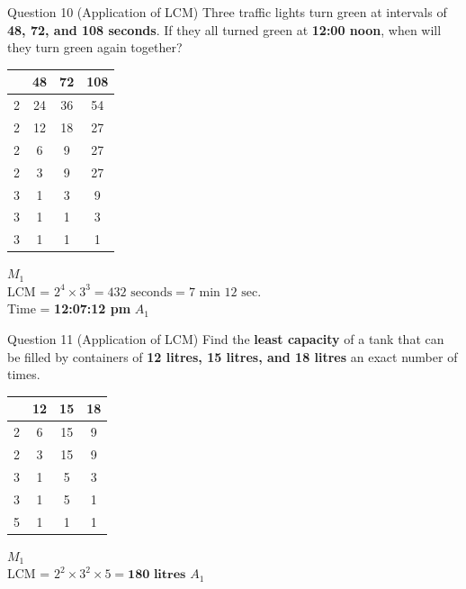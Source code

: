\documentclass[12pt, a4paper, oneside]{article}
\begin{document}
\begin{solvingbox}{Question 10 (Application of LCM)}
Three traffic lights turn green at intervals of \textbf{48, 72, and 108 seconds}. If they all turned green at \textbf{12:00 noon}, when will they turn green again together? \\
\begin{tabular}{|c|c|c|c|} \hline
    & \textbf{48} & \textbf{72} & \textbf{108} \\ \hline
    2 & 24 & 36 & 54 \\ \hline
    2 & 12 & 18 & 27 \\ \hline
    2 & 6 & 9 & 27 \\ \hline
    2 & 3 & 9 & 27 \\ \hline
    3 & 1 & 3 & 9 \\ \hline
    3 & 1 & 1 & 3 \\ \hline
    3 & 1 & 1 & 1 \\ \hline
\end{tabular} \hfill $M_1$ \\
LCM = $2^4 \times 3^3 = 432\text{ seconds} = 7\text{ min } 12\text{ sec}$. \\
Time = \textbf{12:07:12 pm} \hfill $A_1$
\end{solvingbox}

\begin{solvingbox}{Question 11 (Application of LCM)}
Find the \textbf{least capacity} of a tank that can be filled by containers of \textbf{12 litres, 15 litres, and 18 litres} an exact number of times. \\
\begin{tabular}{|c|c|c|c|} \hline
    & \textbf{12} & \textbf{15} & \textbf{18} \\ \hline
    2 & 6 & 15 & 9 \\ \hline
    2 & 3 & 15 & 9 \\ \hline
    3 & 1 & 5 & 3 \\ \hline
    3 & 1 & 5 & 1 \\ \hline
    5 & 1 & 1 & 1 \\ \hline
\end{tabular} \hfill $M_1$ \\
LCM = $2^2 \times 3^2 \times 5 = \mathbf{180\text{ litres}}$ \hfill $A_1$
\end{solvingbox}
\end{document}
